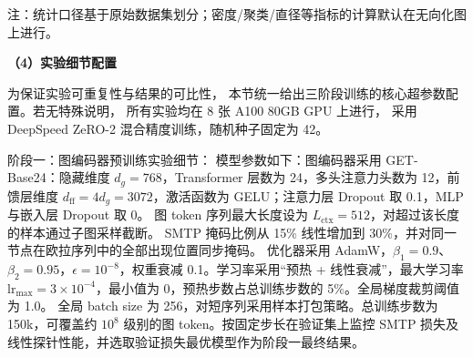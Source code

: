 \begin{table}[htbp]
\centering
\caption{节点分类数据集的图结构特性对比}
\label{tab:dataset_characteristics}
{\raggedright\footnotesize
注：统计口径基于原始数据集划分；密度/聚类/直径等指标的计算默认在无向化图上进行。\par}
\end{table}

\textbf{（4）实验细节配置}

为保证实验可重复性与结果的可比性，
本节统一给出三阶段训练的核心超参数配置。若无特殊说明，
所有实验均在 8 张 A100 80GB GPU 上进行，
采用 DeepSpeed ZeRO-2 混合精度训练，随机种子固定为 42。

{阶段一：图编码器预训练实验细节：}
模型参数如下：图编码器采用 GET-Base24：隐藏维度 \(d_g = 768\)，Transformer 层数为 24，多头注意力头数为 12，前馈层维度 \(d_{\mathrm{ff}} = 4d_g = 3072\)，激活函数为 GELU；注意力层 Dropout 取 0.1，MLP 与嵌入层 Dropout 取 0。
图 token 序列最大长度设为 \(L_{\mathrm{ctx}} = 512\)，对超过该长度的样本通过子图采样截断。
SMTP 掩码比例从 15\% 线性增加到 30\%，并对同一节点在欧拉序列中的全部出现位置同步掩码。
优化器采用 AdamW，\(\beta_1 = 0.9\)、\(\beta_2 = 0.95\)，\(\epsilon = 10^{-8}\)，权重衰减 0.1。学习率采用“预热 + 线性衰减”，最大学习率 \(\mathrm{lr}_{\max} = 3\times10^{-4}\)，最小值为 0，预热步数占总训练步数的 5\%。全局梯度裁剪阈值为 1.0。
全局 batch size 为 256，对短序列采用样本打包策略。总训练步数为 150k，可覆盖约 \(10^8\) 级别的图 token。按固定步长在验证集上监控 SMTP 损失及线性探针性能，并选取验证损失最优模型作为阶段一最终结果。

